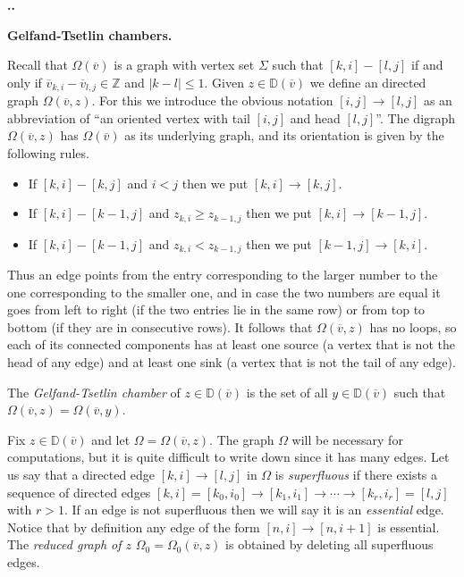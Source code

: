 \documentclass[11pt,fleqn]{amsart}
\renewcommand\thesection{\arabic{section}}
\newcounter{para}[section]
\renewcommand\thepara{\thesection.\arabic{para}}
\def\paragraph{%
 \noindent
 \refstepcounter{para}%
 \textbf{\thepara.}\hspace{1ex}%
}
\newcommand\about[1]{%
 {\bfseries#1.}%
}
\newcommand\ZZ{\mathbb Z}
\newcommand\vv{\overline{v}}
\newcommand\DD{\mathbb D}
\begin{document}
\paragraph
\about{Gelfand-Tsetlin chambers}
\label{gt-chambers}
Recall that $\Omega(\vv)$ is a graph with vertex set $\Sigma$ such that
$[k,i] - [l,j]$ if and only if $\vv_{k,i} - \vv_{l,j} \in \ZZ$ and $|k-l| 
\leq 1$. Given $z \in \DD(\vv)$ we define an directed graph $\Omega(\vv,z)$. 
For this we introduce the obvious notation $[i,j] \rightarrow [l,j]$ as an
abbreviation of ``an oriented vertex with tail $[i,j]$ and head
$[l,j]$''. The digraph $\Omega(\vv,z)$ has $\Omega(\vv)$ as its underlying
graph, and its orientation is given by the following rules.
\begin{itemize}
\item If $[k,i] - [k,j]$ and $i < j$ then we put $[k,i] \rightarrow [k,j]$.

\item If $[k,i] - [k-1,j]$ and $z_{k,i} \geq z_{k-1,j}$ then we put $[k,i] 
\rightarrow [k-1,j]$.

\item If $[k,i] - [k-1,j]$ and $z_{k,i} < z_{k-1,j}$ then we put $[k-1,j] 
\rightarrow [k,i]$.
\end{itemize}
Thus an edge points from the entry corresponding to the larger number to the 
one corresponding to the smaller one, and in case the two numbers are equal it 
goes from left to right (if the two entries lie in the same row) or from top 
to bottom (if they are in consecutive rows). It follows that $\Omega(\vv,z)$ 
has no loops, so each of its connected components has at least one source (a 
vertex that is not the head of any edge) and at least one sink (a vertex that
is not the tail of any edge).
\begin{Definition}
\label{D:gt-chamber}
The \emph{Gelfand-Tsetlin chamber} of $z \in \DD(\vv)$ is the set of all 
$y \in \DD(\vv)$ such that $\Omega(\vv,z) = \Omega(\vv,y)$. 
\end{Definition}
Fix $z \in \DD(\vv)$ and let $\Omega = \Omega(\vv,z)$. The graph $\Omega$ will
be necessary for computations, but it is quite difficult to write down since it
has many edges. Let us say that a directed edge $[k,i] \rightarrow [l,j]$ in 
$\Omega$ is \emph{superfluous} if there exists a sequence of directed edges 
$[k,i] = [k_0, i_0] \rightarrow [k_1, i_1]\rightarrow \cdots \rightarrow 
[k_r, i_r] = [l,j]$ with $r > 1$. If an edge is not superfluous then we will 
say it is an \emph{essential} edge. Notice that by definition any edge of the 
form $[n,i] \rightarrow [n,i+1]$ is essential. The \emph{reduced graph of $z$} 
$\Omega_0 = \Omega_0(\vv,z)$ is obtained by deleting all superfluous edges. 
\end{document}
